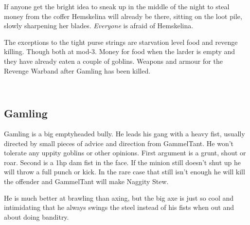If anyone get the bright idea to sneak up in the middle of the night to steal money from the coffer Hemskelina will already be there, sitting on the loot pile, slowly sharpening her blades. \emph{Everyone} is afraid of Hemskelina.

The exceptions to the tight purse strings are starvation level food and revenge killing. Though both at mod-3. Money for food when the larder is empty and they have already eaten a couple of goblins. Weapons and armour for the Revenge Warband after Gamling has been killed.

\


\goodbreak 
\subsection*{Gamling}

Gamling is a big emptyheaded bully. He leads his gang with a heavy fist, usually directed by small pieces of advice and direction from GammelTant. He won't tolerate any uppity goblins or other opinions. First argument is a grunt, shout or roar. Second is a 1hp dam fist in the face. If the minion still doesn't shut up he will throw a full punch or kick. In the rare case that still isn't enough he will kill the offender and GammelTant will make Naggity Stew.

He is much better at brawling than axing, but the big axe is just so cool and intimidating that he always swings the steel instead of his fists when out and about doing banditry.

\

